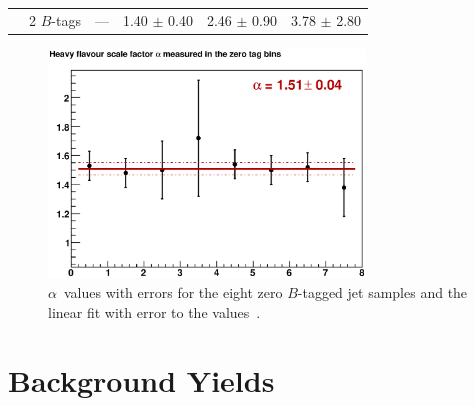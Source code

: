 \begin{table}[!h!tbp]
\begin{center}
\begin{tabular}{c|cccc}
~~2 $B$-tags          &       ---       & 1.40 $\pm$ 0.40 & 2.46 $\pm$ 0.90 &  3.78 $\pm$ 2.80
\end{tabular}
\vspace{-0.1 in}
\end{center}
\end{table}


\begin{figure}[!h!tbp]
\begin{center}
\includegraphics[width=0.75\textwidth]{eps/DataBackground/alpha.eps}
\end{center}
\vspace{-0.1in}
\caption{$\alpha$~values with errors for the eight zero $B$-tagged jet samples and the linear fit with error to the values~\cite{singletopnote}.}
\label{alphafit}
\end{figure}


\section{Background Yields}
\label{backgroundyields}

